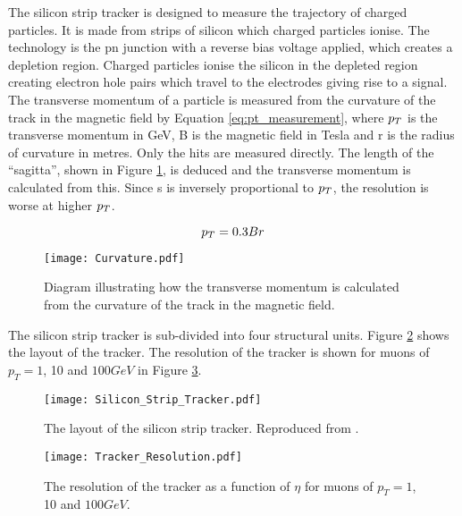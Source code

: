 The silicon strip tracker is designed to measure the trajectory of charged 
particles. It is made from strips of silicon which charged particles ionise. The
technology is the pn junction with a reverse bias voltage applied, which creates
a depletion region. Charged particles ionise the silicon in the depleted region 
creating electron hole pairs which travel to the electrodes giving rise to a 
signal. \\
  
The transverse momentum of a particle is measured from the curvature of the 
track in the magnetic field by Equation \ref{eq:pt_measurement}, where $p_{T}$ is
the transverse momentum in GeV, B is the magnetic field in Tesla and r is the
radius of curvature in metres. Only the hits are measured directly. The 
length of the ``sagitta'', shown in Figure \ref{fig:curvature}, is deduced and 
the transverse momentum is calculated from this. Since s is inversely 
proportional to $p_{T}$, the resolution is worse at higher $p_{T}$.

\begin{equation}
p_{T} = 0.3Br
\label{eq:pt_measurement}
\end{equation}

\begin{figure}
\begin{center}
\texttt{[image: Curvature.pdf]}
\end{center}
\caption{Diagram illustrating how the transverse momentum is calculated from the
curvature of the track in the magnetic field.}
\label{fig:curvature}
\end{figure}

The silicon strip tracker is sub-divided into four structural units. Figure 
\ref{fig:Silicon_Strip_Tracker} shows the layout of the tracker. The resolution 
of the tracker is shown for muons of $p_{T} = 1$, 10 and $100 \unit{GeV}$ in 
Figure \ref{fig:tracker_resolution}.

\begin{figure}
\texttt{[image: Silicon\_Strip\_Tracker.pdf]}
\caption{The layout of the silicon strip tracker. Reproduced from 
\cite{physics_tdr_1}.}
\label{fig:Silicon_Strip_Tracker}
\end{figure}

\begin{figure}
\texttt{[image: Tracker\_Resolution.pdf]}
\caption{The resolution of the tracker as a function of $\eta$ for muons of
$p_{T} = 1$, 10 and $100 \unit{GeV}$.}
\label{fig:tracker_resolution}
\end{figure}

